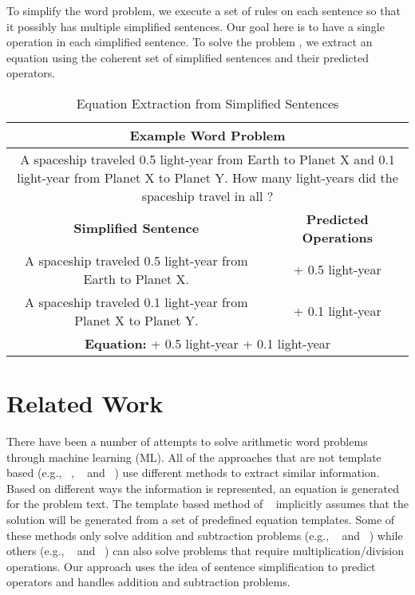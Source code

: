 \documentclass[11pt]{article}
\begin{document}
To simplify the word problem, we execute a set of rules on each sentence so that it possibly has multiple simplified sentences. Our goal here is to have a single operation in each simplified sentence. To solve the problem , we extract an equation using the coherent set of simplified sentences and their predicted operators.
\begin{table}[h]
\fontsize{9}{9}
\begin{tabularx}{7.9cm}{|c|c|}
\hline 
\multicolumn{2}{|c|}{\bf{Example Word Problem}} \\ \hline
\multicolumn{2}{|p{7cm}|}{A spaceship traveled 0.5 light-year from Earth to Planet X and 0.1 light-year from Planet X to Planet Y. How many light-years did the spaceship travel in all ?} \\ \hline
\multicolumn{1}{|m{5cm}|}{\bf \centering Simplified Sentence} & \multicolumn{1}{m{2cm}|}{\bf \centering Predicted Operations} \\ \hline
\multicolumn{1}{|m{5cm}|}{A spaceship traveled 0.5 light-year from Earth to Planet X.} & \multicolumn{1}{m{2cm}|}{\centering + 0.5 light-year} \\ \hline
\multicolumn{1}{|m{5cm}|}{A spaceship traveled 0.1 light-year from Planet X to Planet Y.} & \multicolumn{1}{m{2cm}|}{\centering + 0.1 light-year} \\ \hline
\multicolumn{2}{|m{7cm}|}{\centering \textbf{Equation:}  + 0.5 light-year + 0.1 light-year} \\ \hline
\end{tabularx}
\caption{\label{figure:1} Equation Extraction from Simplified Sentences }
\end{table}

\section{Related Work}
There have been a number of attempts to solve arithmetic word problems through machine learning (ML). All of the approaches that are not template based (e.g., ~\cite{ARIS:14}, ~\cite{RoyT:15} and ~\cite{RoyR:15}) use different methods to extract similar information. Based on different ways the information is represented, an equation is generated for the problem text. The template based method of ~\cite{Kushman:14} implicitly assumes that the solution will be generated from a set of predefined equation templates. Some of these methods only solve addition and subtraction problems (e.g., ~\cite{ARIS:14} and ~\cite{RoyT:15}) while others (e.g., ~\cite{RoyR:15} and ~\cite{Kushman:14}) can also solve problems that require multiplication/division operations. Our approach uses the idea of sentence simplification to predict operators and handles addition and subtraction problems.
\end{document}
